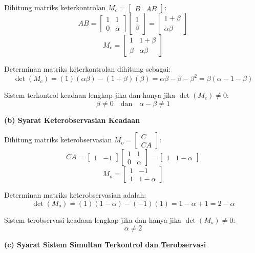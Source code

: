 \documentclass[11pt,a4paper]{article}
\begin{document}
Dihitung matriks keterkontrolan $M_c = \begin{bmatrix} B & AB \end{bmatrix}$:
$$AB = \begin{bmatrix} 1 & 1 \\ 0 & \alpha \end{bmatrix} \begin{bmatrix} 1 \\ \beta \end{bmatrix} = \begin{bmatrix} 1 + \beta \\ \alpha\beta \end{bmatrix}$$
$$M_c = \begin{bmatrix} 1 & 1 + \beta \\ \beta & \alpha\beta \end{bmatrix}$$

Determinan matriks keterkontrolan dihitung sebagai:
$$\det(M_c) = (1)(\alpha\beta) - (1 + \beta)(\beta) = \alpha\beta - \beta - \beta^2 = \beta(\alpha - 1 - \beta)$$

Sistem terkontrol keadaan lengkap jika dan hanya jika $\det(M_c) \ne 0$:
$$\beta \ne 0 \quad \text{dan} \quad \alpha - \beta \ne 1$$

\textbf{(b) Syarat Keterobservasian Keadaan}

Dihitung matriks keterobservasian $M_o = \begin{bmatrix} C \\ CA \end{bmatrix}$:
$$CA = \begin{bmatrix} 1 & -1 \end{bmatrix} \begin{bmatrix} 1 & 1 \\ 0 & \alpha \end{bmatrix} = \begin{bmatrix} 1 & 1 - \alpha \end{bmatrix}$$
$$M_o = \begin{bmatrix} 1 & -1 \\ 1 & 1 - \alpha \end{bmatrix}$$

Determinan matriks keterobservasian adalah:
$$\det(M_o) = (1)(1 - \alpha) - (-1)(1) = 1 - \alpha + 1 = 2 - \alpha$$

Sistem terobservasi keadaan lengkap jika dan hanya jika $\det(M_o) \ne 0$:
$$\alpha \ne 2$$

\textbf{(c) Syarat Sistem Simultan Terkontrol dan Terobservasi}
\end{document}
